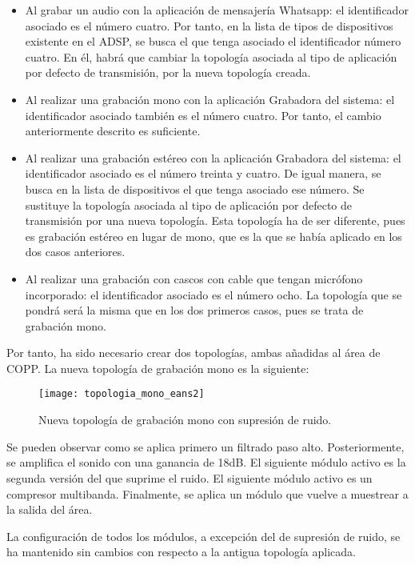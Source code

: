 \begin{itemize}
	\item{Al grabar un audio con la aplicación de mensajería Whatsapp: el identificador asociado es el número cuatro. Por tanto, en la lista de tipos de dispositivos existente en el \gls{ADSP}, se busca el que tenga asociado el identificador número cuatro. En él, habrá que cambiar la topología asociada al tipo de aplicación por defecto de transmisión, por la nueva topología creada.}
	\item{Al realizar una grabación mono con la aplicación Grabadora del sistema: el identificador asociado también es el número cuatro. Por tanto, el cambio anteriormente descrito es suficiente.}
	\item{Al realizar una grabación estéreo con la aplicación Grabadora del sistema: el identificador asociado es el número treinta y cuatro. De igual manera, se busca en la lista de dispositivos el que tenga asociado ese número. Se sustituye la topología asociada al tipo de aplicación por defecto de transmisión por una nueva topología. Esta topología ha de ser diferente, pues es grabación estéreo en lugar de mono, que es la que se había aplicado en los dos casos anteriores.}
	\item{Al realizar una grabación con cascos con cable que tengan micrófono incorporado: el identificador asociado es el número ocho. La topología que se pondrá será la misma que en los dos primeros casos, pues se trata de grabación mono.}
\end{itemize}

Por tanto, ha sido necesario crear dos topologías, ambas añadidas al área de \gls{COPP}. La nueva topología de grabación mono es la siguiente:

\begin{figure}[H]
	\centering
	\texttt{[image: topologia\_mono\_eans2]}
	\caption{Nueva topología de grabación mono con supresión de ruido.} 
	\label{fig:mono_eans2}
\end{figure}

Se pueden observar como se aplica primero un filtrado paso alto. Posteriormente, se amplifica el sonido con una ganancia de 18\gls{dB}. El siguiente módulo activo es la segunda versión del que suprime el ruido. El siguiente módulo activo es un compresor multibanda. Finalmente, se aplica un módulo que vuelve a muestrear a la salida del área.

La configuración de todos los módulos, a excepción del de supresión de ruido, se ha mantenido sin cambios con respecto a la antigua topología aplicada.


